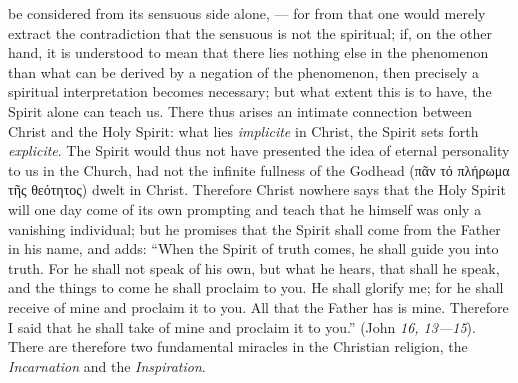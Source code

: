 \documentclass[12pt]{book}
\newcommand{\opage}[1]{\marginnote{\footnotesize\textit{[#1]}}}
\begin{document}
be considered from its sensuous side alone, --- for from that one would merely
extract the contradiction that the sensuous is not the spiritual; if, on the
other hand, it is understood to mean that there lies nothing else in the
phenomenon than what can be derived by a negation of the phenomenon, then
precisely a spiritual interpretation becomes necessary; but what extent this is
to have, the Spirit alone can teach us. There thus arises an intimate connection
between Christ and the Holy Spirit: what lies \textit{implicite} in Christ, the
Spirit sets forth \textit{explicite}. The Spirit would thus not have presented
the idea of eternal personality to us in the Church, had not the infinite
fullness of the Godhead (πᾶν τό πλήρωμα τῆς θεότητος) dwelt in Christ. Therefore
Christ nowhere says that the Holy Spirit will one day come of its own prompting
and teach that he himself was only a vanishing individual; but he promises that
the Spirit shall come from the Father in his name, and adds: ``When the Spirit of
truth comes, he shall guide you into truth. For he shall not speak of his own,
but what he hears, that shall he speak, and the things to come he shall proclaim
to you. He shall glorify me; for he shall receive of mine and proclaim it to you.
All that the Father has is mine. Therefore I said that he shall take of mine and
\opage{154} proclaim it to you.'' (John \textit{16, 13---15}). There are
therefore two fundamental miracles in the Christian religion, the
\emph{Incarnation} and the \emph{Inspiration}.
\end{document}

